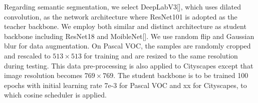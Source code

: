 \documentclass[10pt,twocolumn,letterpaper]{article}
\begin{document}
Regarding semantic segmentation, we select DeepLabV3[], which uses dilated convolution, as the network architecture where ResNet101 is adopted as the teacher backbone. We employ both similar and distinct architecture as student backbone including ResNet18 and MoibleNet[]. We use random flip and Gaussian blur for data augmentation. On Pascal VOC, the samples are randomly cropped and rescaled to $513\times 513$ for training and are resized to the same resolution during testing. This data pre-processing is also applied to Cityscapes except that image resolution becomes $769\times769$. The student backbone is to be trained 100 epochs with initial learning rate 7e-3 for Pascal VOC and xx for Cityscapes, to which cosine scheduler is applied.   

\begin{table*}[!t]
\centering
\caption{Top-1 accuracy(\%) in Cifar-100 testing set. For fair comparison, the loss term $\mathcal{L}_{\rm{KL}}$ in Eq.~\ref{eq:objective} is removed in this experiment. We report the performance gain of each method against traditional KD \cite{Hinton2015DistillingTK}. Our method outperforms other comparison methods by a significant margin. We have at least 1 absolute point of performance gain against KD \cite{Hinton2015DistillingTK} on 5 out of 7 experimental settings.}
\end{table*}
\end{document}
